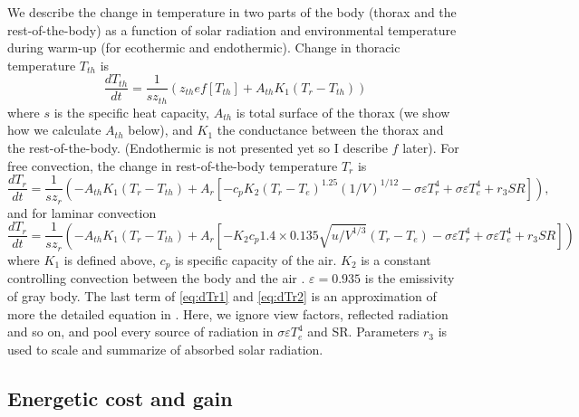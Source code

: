 We describe the change in temperature in two parts of the body (thorax and the rest-of-the-body) as a function of solar radiation and environmental temperature during warm-up (for ecothermic and endothermic). 
Change in thoracic temperature $T_{th}$ is 
\begin{equation} \label{eq:dTh}
	\frac{dT_{th}}{dt} = \frac{1}{s z_{th}} (z_{th} e f[T_{th}] +  A_{th} K_1(T_r - T_{th}))
\end{equation}
where $s$ is the specific heat capacity, $A_{th}$ is total surface of the thorax (we show how we calculate $A_{th}$ below), and $K_1$ the conductance between the thorax and the rest-of-the-body.
(Endothermic is not presented yet so I describe $f$ later).
For free convection, the change in rest-of-the-body temperature $T_r$ is
\begin{equation} \label{eq:dTr1}
	\frac{dT_{r}}{dt} = \frac{1}{s z_{r}} \left( - A_{th} K_1(T_r - T_{th}) + A_r \left[ - c_p K_2 (T_r- T_e)^{1.25} (1/V)^{1/12}- \sigma \varepsilon T_r^4 + \sigma \varepsilon T_e^4  + r_3 SR  \right] \right),
\end{equation}
and for laminar convection
\begin{equation} \label{eq:dTr2}
	\frac{dT_{r}}{dt} = \frac{1}{s z_{r}} \left( - A_{th} K_1(T_r - T_{th}) + A_r \left[ - K_2 c_p  1.4 \times 0.135 \sqrt{u/V^{1/3}} (T_r- T_e) - \sigma \varepsilon T_r^4 + \sigma \varepsilon T_e^4  + r_3 SR  \right] \right)
\end{equation}
where $K_1$ is defined above, $c_p$ is specific capacity of the air. 
$K_2$ is a constant controlling convection between the body and the air \citep{Campbell2012}.
$\varepsilon = 0.935$  is the emissivity of gray body.
The last term of \cref{eq:dTr1} and \cref{eq:dTr2} is an approximation of more the detailed equation in \citet{Campbell2012}.
Here, we ignore view factors, reflected radiation and so on, and pool every source of radiation in $ \sigma \varepsilon T_e^4$ and SR. 
Parameters $r_3$ is used to scale and summarize of absorbed solar radiation.


\subsection*{Energetic cost and gain} %
